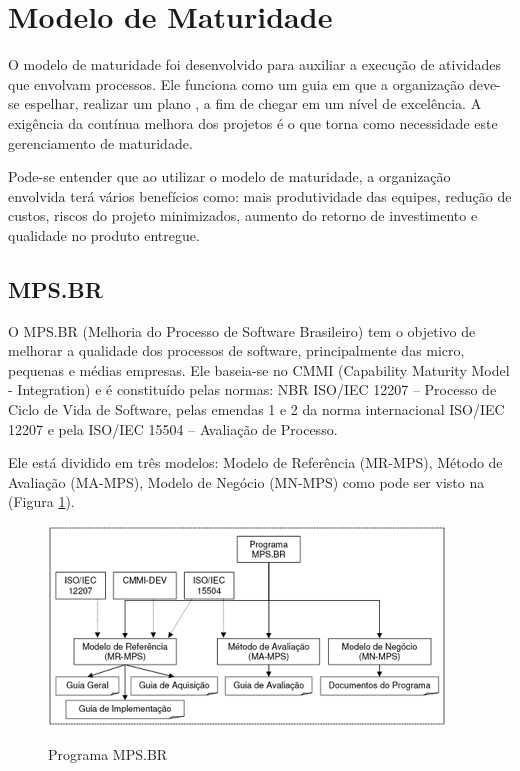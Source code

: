 \section {Modelo de Maturidade}

O modelo de maturidade foi desenvolvido para auxiliar a execução de atividades que envolvam processos. Ele funciona como um guia em que a organização deve-se  espelhar, realizar um plano , a fim de chegar em um nível de excelência. A exigência da contínua melhora dos projetos é o que torna como necessidade este gerenciamento de maturidade.\cite{revistaER}

Pode-se entender que ao utilizar o modelo de maturidade, a organização envolvida terá vários benefícios como: mais produtividade das equipes, redução de custos, riscos do projeto minimizados, aumento do retorno de investimento e qualidade no produto entregue.

\subsection {MPS.BR}

O MPS.BR (Melhoria do Processo de Software Brasileiro) tem o objetivo de melhorar a qualidade dos processos de software, principalmente das micro, pequenas e médias empresas. Ele baseia-se no CMMI (Capability Maturity Model - Integration) e é constituído pelas normas: NBR ISO/IEC 12207 – Processo de Ciclo de Vida de Software, pelas emendas 1 e 2 da norma internacional ISO/IEC 12207 e pela ISO/IEC 15504 – Avaliação de Processo. \cite{Silveira}

Ele está dividido em três modelos: Modelo de Referência (MR-MPS), Método de Avaliação (MA-MPS), Modelo de Negócio (MN-MPS) como pode ser visto na (Figura \ref{img:mps2}).

\FloatBarrier
\begin{figure}[!htpd]
		\centering
		\includegraphics[scale=1.0]{figuras/mps2}
		\label{img:mps2}
		\caption{Programa MPS.BR}
\end{figure}
\FloatBarrier

